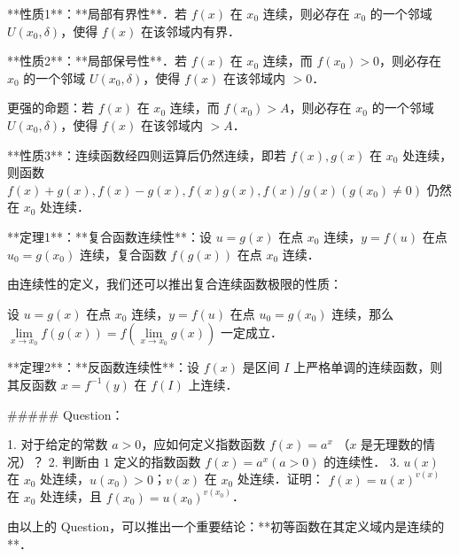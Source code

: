   **性质1**：**局部有界性**．若 $f(x)$ 在 $x_0$ 连续，则必存在 $x_0$ 的一个邻域 $U(x_0,\delta)$，使得 $f(x)$ 在该邻域内有界．

  **性质2**：**局部保号性**．若 $f(x)$ 在 $x_0$ 连续，而 $f(x_0)>0$，则必存在 $x_0$ 的一个邻域 $U(x_0,\delta)$，使得 $f(x)$ 在该邻域内 $>0$．

  更强的命题：若 $f(x)$ 在 $x_0$ 连续，而 $f(x_0)>A$，则必存在 $x_0$ 的一个邻域 $U(x_0,\delta)$，使得 $f(x)$ 在该邻域内 $>A$．

  **性质3**：连续函数经四则运算后仍然连续，即若 $f(x),g(x)$ 在 $x_0$ 处连续，则函数 $f(x)+g(x),f(x)-g(x),f(x)g(x),f(x)/g(x)(g(x_0)\neq 0)$ 仍然在 $x_0$ 处连续．

  **定理1**：**复合函数连续性**：设 $u=g(x)$ 在点 $x_0$ 连续，$y=f(u)$ 在点 $u_0=g(x_0)$ 连续，复合函数 $f(g(x))$ 在点 $x_0$ 连续．

  由连续性的定义，我们还可以推出复合连续函数极限的性质：

  设 $u=g(x)$ 在点 $x_0$ 连续，$y=f(u)$ 在点 $u_0=g(x_0)$ 连续，那么$\lim\limits_{x\rightarrow x_0}f(g(x))=f(\lim\limits_{x\rightarrow x_0}g(x))$ 一定成立．

  **定理2**：**反函数连续性**：设 $f(x)$ 是区间 $I$ 上严格单调的连续函数，则其反函数 $x=f^{-1}(y)$ 在 $f(I)$ 上连续．

  ##### Question：

  1. 对于给定的常数 $a>0$，应如何定义指数函数 $f(x)=a^x$ （$x$ 是无理数的情况）？
  2. 判断由 $1$ 定义的指数函数 $f(x)=a^x(a>0)$ 的连续性．
  3. $u(x)$ 在 $x_0$ 处连续，$u(x_0)>0$；$v(x)$ 在 $x_0$ 处连续．证明： $f(x)=u(x)^{v(x)}$ 在 $x_0$ 处连续，且 $f(x_0)=u(x_0)^{v(x_0)}$．

  由以上的 Question，可以推出一个重要结论：**初等函数在其定义域内是连续的**．